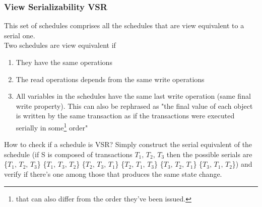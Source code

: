 \documentclass{article}
\begin{document}
				\subsubsection{View Serializability VSR}
					This set of schedules comprises all the schedules that are view equivalent to a serial one.\\
					Two schedules are view equivalent if
					\begin{enumerate}
						\item They have the same operations
						\item The read operations depends from the same write operations
						\item All variables in the schedules have the same last write operation (same final write property). This can also be rephrased as "the final value of each object is written by the same transaction as if the transactions were executed serially in some\footnote{that can also differ from the order they've been issued.} order"
					\end{enumerate}
					How to check if a schedule is VSR? Simply construct the serial equivalent of the schedule (if S is composed of transactions $T_1, \,T_2, \,T_3$ then the possible serials are  \{$T_1, \,T_2, \,T_3$\} \{$T_1, \,T_3, \,T_2$\} \{$T_2, \,T_3, \,T_1$\} \{$T_2, \,T_1, \,T_3$\} \{$T_3, \,T_2, \,T_1$\} \{$T_3, \,T_1, \,T_2$\}) and verify if there's one among those that produces the same state change.
\end{document}
